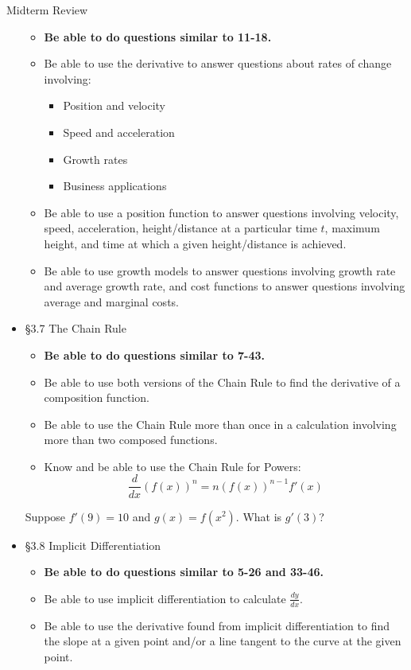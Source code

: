 \documentclass[cal1spr16Lectures.tex]{subfiles}
\begin{document}
\begin{frame}[allowframebreaks]{Midterm Review}
\begin{itemize}
	\begin{itemize}\footnotesize
	\item {\bf Be able to do questions similar to 11-18.}
	\item Be able to use the derivative to answer questions about rates of change involving:
		\begin{itemize}%
		\item Position and velocity
		\item Speed and acceleration
		\item Growth rates
		\item Business applications
		\end{itemize}
\framebreak		
	\item Be able to use a position function to answer questions involving velocity, speed, acceleration, height/distance at a particular time $t$, maximum height, and time at which a given height/distance is achieved.
	\item Be able to use growth models to answer questions involving growth rate and average growth rate, and cost functions to answer questions involving average and marginal costs.
	\end{itemize}
%
\framebreak
\item \S 3.7 The Chain Rule
	\begin{itemize}\footnotesize
	\item {\bf Be able to do questions similar to 7-43.}
	\item Be able to use both versions of the Chain Rule to find the derivative of a composition function.
	\item Be able to use the Chain Rule more than once in a calculation involving more than two composed functions.
	\item Know and be able to use the Chain Rule for Powers:
	\[\frac{d}{dx}\left(f(x)\right)^n=n\left(f(x)\right)^{n-1}f'(x)\]
	\end{itemize}
\framebreak
\begin{exe} Suppose $f'(9)=10$ and $g(x)=f(x^2)$.  What is $g'(3)$? \end{exe}
%
\framebreak
\item \S 3.8 Implicit Differentiation
	\begin{itemize}\footnotesize
	\item {\bf Be able to do questions similar to 5-26 and 33-46.}
	\item Be able to use implicit differentiation to calculate $\textstyle\frac{dy}{dx}.$
	\item Be able to use the derivative found from implicit differentiation to find the slope at a given point and/or a line tangent to the curve at the given point.

\end{itemize}
\end{itemize}
\end{frame}
\end{document}
